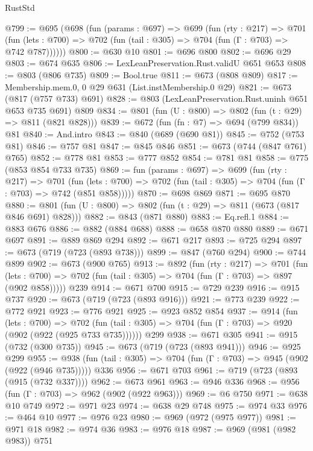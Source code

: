 \begin{lexlean}{RustStd}
\begin{coremodule}
@799 := @695
    (@698
      (fun (params : @697) =>
      @699
        (fun (rty : @217) =>
        @701
          (fun (lets : @700) => @702 (fun (tail : @305) => @704 (fun (Γ : @703) => @742 @787))))))
@800 := @630 @10
@801 := @696 @800
@802 := @696 @29
@803 := @674 @635
@806 := LexLeanPreservation.Rust.validU @651 @653
@808 := @803 (@806 @735)
@809 := Bool.true
@811 := @673 (@808 @809)
@817 := Membership.mem.{0, 0} @29 @631 (List.instMembership.{0} @29)
@821 := @673 (@817 (@757 @733) @691)
@828 := @803 (LexLeanPreservation.Rust.uninh @651 @653 @735 @691) @809
@834 := @801 (fun (U : @800) => @802 (fun (t : @29) => @811 (@821 @828)))
@839 := @672 (fun (fn : @7) => @694 (@799 @834)) @81
@840 := And.intro
@843 := @840 (@689 (@690 @81))
@845 := @752 (@753 @81)
@846 := @757 @81
@847 := @845 @846
@851 := @673 (@744 (@847 @761) @765)
@852 := @778 @81
@853 := @777 @852
@854 := @781 @81
@858 := @775 (@853 @854 @733 @735)
@869 := fun (params : @697) =>
  @699
    (fun (rty : @217) =>
    @701
      (fun (lets : @700) => @702 (fun (tail : @305) => @704 (fun (Γ : @703) => @742 (@851 @858)))))
@870 := @698 @869
@871 := @695 @870
@880 := @801 (fun (U : @800) => @802 (fun (t : @29) => @811 (@673 (@817 @846 @691) @828)))
@882 := @843 (@871 @880)
@883 := Eq.refl.{1}
@884 := @883 @676
@886 := @882 (@884 @688)
@888 := @658 @870 @880
@889 := @671 @697
@891 := @889 @869 @294
@892 := @671 @217
@893 := @725 @294
@897 := @673 (@719 (@723 (@893 @738)))
@899 := @847 (@760 @294)
@900 := @744 @899
@902 := @673 (@900 @765)
@913 := @892
    (fun (rty : @217) =>
    @701
      (fun (lets : @700) => @702 (fun (tail : @305) => @704 (fun (Γ : @703) => @897 (@902 @858)))))
    @239
@914 := @671 @700
@915 := @729 @239
@916 := @915 @737
@920 := @673 (@719 (@723 (@893 @916)))
@921 := @773 @239
@922 := @772 @921
@923 := @776 @921
@925 := @923 @852 @854
@937 := @914
    (fun (lets : @700) =>
    @702 (fun (tail : @305) => @704 (fun (Γ : @703) => @920 (@902 (@922 (@925 @733 @735))))))
    @299
@938 := @671 @305
@941 := @915 (@732 (@300 @735))
@945 := @673 (@719 (@723 (@893 @941)))
@946 := @925 @299
@955 := @938 (fun (tail : @305) => @704 (fun (Γ : @703) => @945 (@902 (@922 (@946 @735))))) @336
@956 := @671 @703
@961 := @719 (@723 (@893 (@915 (@732 @337))))
@962 := @673 @961
@963 := @946 @336
@968 := @956 (fun (Γ : @703) => @962 (@902 (@922 @963)))
@969 := @6 @750
@971 := @638 @10 @749
@972 := @971 @23
@974 := @638 @29 @748
@975 := @974 @33
@976 := @464 @10
@977 := @976 @23
@980 := @969 (@972 (@975 @977))
@981 := @971 @18
@982 := @974 @36
@983 := @976 @18
@987 := @969 (@981 (@982 @983)) @751

\end{coremodule}
\end{lexlean}
